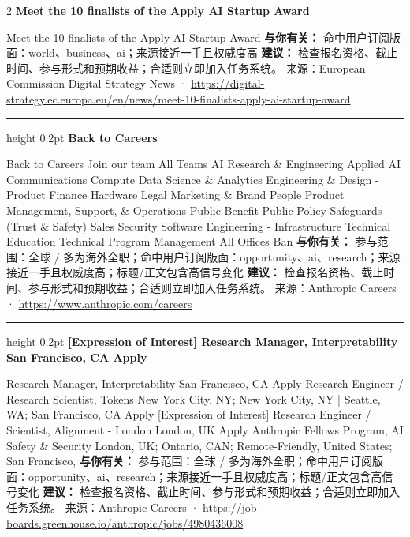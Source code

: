 \documentclass[10.5pt]{ctexart}
\begin{document}
\begin{multicols}{2}
{\large\bfseries Meet the 10 finalists of the Apply AI Startup Award}\par
Meet the 10 finalists of the Apply AI Startup Award
\textbf{与你有关：} 命中用户订阅版面：world、business、ai；来源接近一手且权威度高
\textbf{建议：} 检查报名资格、截止时间、参与形式和预期收益；合适则立即加入任务系统。
{\footnotesize\color{ormuted} 来源：European Commission Digital Strategy News · \url{https://digital-strategy.ec.europa.eu/en/news/meet-10-finalists-apply-ai-startup-award}}
\vspace{2mm}
\hrule height 0.2pt
\vspace{2mm}
{\large\bfseries Back to Careers}\par
Back to Careers Join our team All Teams AI Research \& Engineering Applied AI Communications Compute Data Science \& Analytics Engineering \& Design - Product Finance Hardware Legal Marketing \& Brand People Product Management, Support, \& Operations Public Benefit Public Policy Safeguards (Trust \& Safety) Sales Security Software Engineering - Infrastructure Technical Education Technical Program Management All Offices Ban
\textbf{与你有关：} 参与范围：全球 / 多为海外全职；命中用户订阅版面：opportunity、ai、research；来源接近一手且权威度高；标题/正文包含高信号变化
\textbf{建议：} 检查报名资格、截止时间、参与形式和预期收益；合适则立即加入任务系统。
{\footnotesize\color{ormuted} 来源：Anthropic Careers · \url{https://www.anthropic.com/careers}}
\vspace{2mm}
\hrule height 0.2pt
\vspace{2mm}
{\large\bfseries [Expression of Interest] Research Manager, Interpretability San Francisco, CA Apply}\par
[Expression of Interest] Research Manager, Interpretability San Francisco, CA Apply Research Engineer / Research Scientist, Tokens New York City, NY; New York City, NY | Seattle, WA; San Francisco, CA Apply [Expression of Interest] Research Engineer / Scientist, Alignment - London London, UK Apply Anthropic Fellows Program, AI Safety \& Security London, UK; Ontario, CAN; Remote-Friendly, United States; San Francisco, 
\textbf{与你有关：} 参与范围：全球 / 多为海外全职；命中用户订阅版面：opportunity、ai、research；来源接近一手且权威度高；标题/正文包含高信号变化
\textbf{建议：} 检查报名资格、截止时间、参与形式和预期收益；合适则立即加入任务系统。
{\footnotesize\color{ormuted} 来源：Anthropic Careers · \url{https://job-boards.greenhouse.io/anthropic/jobs/4980436008}}
\vspace{2mm}

\end{multicols}
\end{document}
